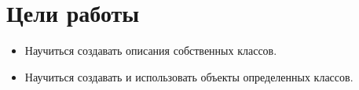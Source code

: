 \section{Цели работы}

\begin{itemize}
\item 
  Научиться создавать описания собственных классов.
\item
  Научиться создавать и использовать объекты определенных классов.
\end{itemize}


